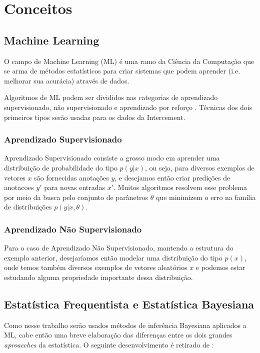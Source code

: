 \chapter{Conceitos}
\label{cap:conceitos}


\section{Machine Learning}

O campo de Machine Learning (ML) é uma ramo da Ciência da Computação que se arma de métodos estatísticos para criar sistemas que podem aprender (i.e. melhorar sua acurácia) através de dados.

Algoritmos de ML podem ser divididos nas categorias de aprendizado supervisionado, não supervisionado e aprendizado por reforço \citep{dlbook}. Técnicas dos dois primeiros tipos serão usadas para os dados da Intercement.

\subsection{Aprendizado Supervisionado}

Aprendizado Supervisionado consiste a grosso modo em aprender uma distribuição de probabilidade do tipo $p(y | x)$, ou seja, para diversos exemplos de vetores $x$ são fornecidas anotações $y$, e desejamos então criar predições de anotacoes $y'$ para novas entradas $x'$. Muitos algoritmos resolvem esse problema por meio da busca pelo conjunto de parânetros $\theta$ que minimizem o erro na família de distribuições $p(y | x,\theta)$.

\subsection{Aprendizado Não Supervisionado}

Para o caso de Aprendizado Não Supervisionado, mantendo a estrutura do exemplo anterior, desejaríamos então modelar uma distribuição do tipo $p(x)$, onde temos também diversos exemplos de vetores aleatórios $x$ e podemos estar estudando alguma propriedade importante dessa distribuição.

\section{Estatística Frequentista e Estatística Bayesiana}

Como nesse trabalho serão usados métodos de inferência Bayesiana aplicados a ML,
cabe então uma breve elaboração das diferenças entre os dois grandes
\textit{aproacches} da estatística. O seguinte desenvolvimento é retirado de \cite{dlbook}:\\

